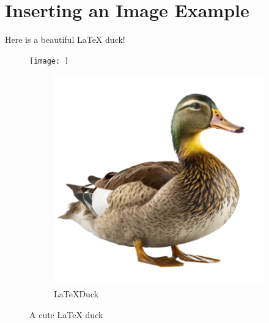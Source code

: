\documentclass{article}
\begin{document}
\section*{Inserting an Image Example}

Here is a beautiful LaTeX duck! 

\begin{figure}[h!]
\centering
\texttt{[image: ]}
\begin{figure}
    \centering
    \includegraphics[width=0.5\linewidth]{duck.png}
    \caption{\LaTeX Duck}
    \label{fig:enter-label}
\end{figure}
\caption{A cute LaTeX duck}
\label{fig:duck}
\end{figure}
\end{document}
